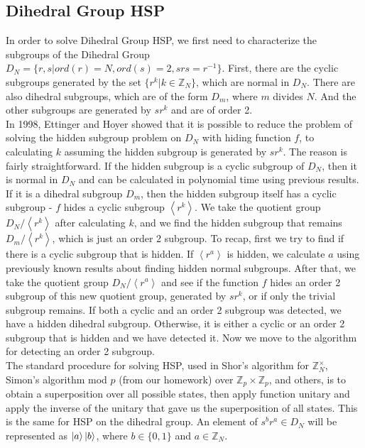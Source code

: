 \documentclass[12pt]{article}
\theoremstyle{plain}
\theoremstyle{definition}
\begin{document}
\subsection{Dihedral Group HSP}
In order to solve Dihedral Group HSP, we first need to characterize the subgroups of the Dihedral Group 
$D_N=\lbrace r,s| ord(r)=N,ord(s)=2,srs=r^{-1}\rbrace$.
First, there are the cyclic subgroups generated by the set 
$\lbrace r^k|k\in\mathbb{Z}_N\rbrace$, which are normal in $D_N$.
There are also dihedral subgroups, which are of the form $D_m$, where $m$ divides $N$.
And the other subgroups are generated by $sr^k$ and are of order 2. \\
In 1998, Ettinger and Hoyer	showed that it is possible to reduce the problem of solving the hidden subgroup problem on $D_N$ with hiding function $f$, to calculating $k$ assuming the hidden subgroup is generated by $sr^k$.
The reason is fairly straightforward. If the hidden subgroup is a cyclic subgroup of $D_N$, then it is normal in $D_N$ and can be calculated in polynomial time using previous results.
If it is a dihedral subgroup $D_m$, then the hidden subgroup itself has a cyclic subgroup - $f$ hides a cyclic subgroup $\left<r^k\right>$.
We take the quotient group $D_N/\left<r^k\right>$ after calculating $k$, and we find the hidden subgroup that remains $D_m/\left<r^k\right>$, which is just an order 2 subgroup.
To recap, first we try to find if there is a cyclic subgroup that is hidden. If $\left<r^a\right>$ is hidden, we calculate $a$ using previously known results about finding hidden normal subgroups.
After that, we take the quotient group $D_N/\left<r^a\right>$ and see if the function $f$ hides an order 2 subgroup of this new quotient group, generated by $sr^k$, or if only the trivial subgroup remains.
If both a cyclic and an order 2 subgroup was detected, we have a hidden dihedral subgroup. Otherwise, it is either a cyclic or an order 2 subgroup that is hidden and we have detected it. Now we move to the algorithm for detecting an order 2 subgroup.\\
The standard procedure for solving HSP, used in Shor's algorithm for $\mathbb{Z}^\times_N$, Simon's algorithm mod $p$ (from our homework) over $\mathbb{Z}_p\times\mathbb{Z}_p$, and others, is to obtain a superposition over all possible states, then apply function unitary and apply the inverse of the unitary that gave us the superposition of all states.
This is the same for HSP on the dihedral group. An element of $s^br^a\in D_N$ will be represented as $\left\vert{a}\right\rangle\left\vert{b}\right\rangle$, where $b\in\lbrace 0,1\rbrace$ and $a\in\mathbb{Z}_N$.
\end{document}
